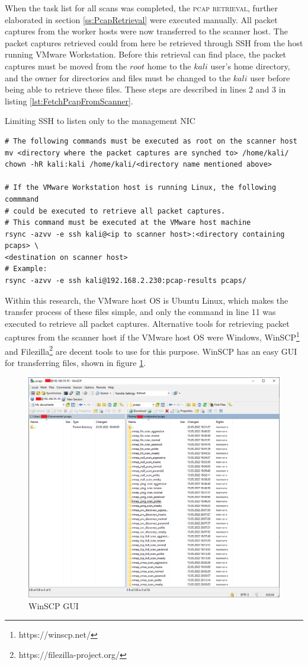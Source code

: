 When the task list for all scans was completed, the \textsc{pcap retrieval}, further elaborated in section \ref{ss:PcapRetrieval} were executed manually.
All packet captures from the worker hosts were now transferred to the scanner host.
The packet captures retrieved could from here be retrieved through SSH from the host running VMware Workstation.
Before this retrieval can find place, the packet captures must be moved from the $root$ home to the $kali$ user's home directory, and the owner for directories and files must be changed to the $kali$ user before being able to retrieve these files. These steps are described in lines 2 and 3 in listing \ref{lst:FetchPcapFromScanner}.

\begin{listing}[!ht]
\caption{Limiting SSH to listen only to the management NIC}
\label{lst:FetchPcapFromScanner}
\begin{verbatim}
# The following commands must be executed as root on the scanner host
mv <directory where the packet captures are synched to> /home/kali/
chown -hR kali:kali /home/kali/<directory name mentioned above>

# If the VMware Workstation host is running Linux, the following commmand
# could be executed to retrieve all packet captures.
# This command must be executed at the VMware host machine
rsync -azvv -e ssh kali@<ip to scanner host>:<directory containing pcaps> \
<destination on scanner host>
# Example:
rsync -azvv -e ssh kali@192.168.2.230:pcap-results pcaps/
\end{verbatim}
\end{listing}

Within this research, the VMware host OS is Ubuntu Linux, which makes the transfer process of these files simple, and only the command in line 11 was executed to retrieve all packet captures.
Alternative tools for retrieving packet captures from the scanner host if the VMware host OS were Windows, WinSCP\footnote{https://winscp.net/} and Filezilla\footnote{https://filezilla-project.org/} are decent tools to use for this purpose. WinSCP has an easy GUI for transferring files, shown in figure \ref{fig:WinSCP}.

\begin{figure}[htbp]
\centerline{\includegraphics[scale=0.4]{images/misc/WinSCP.PNG}}
\caption{WinSCP GUI}
\label{fig:WinSCP}
\end{figure}